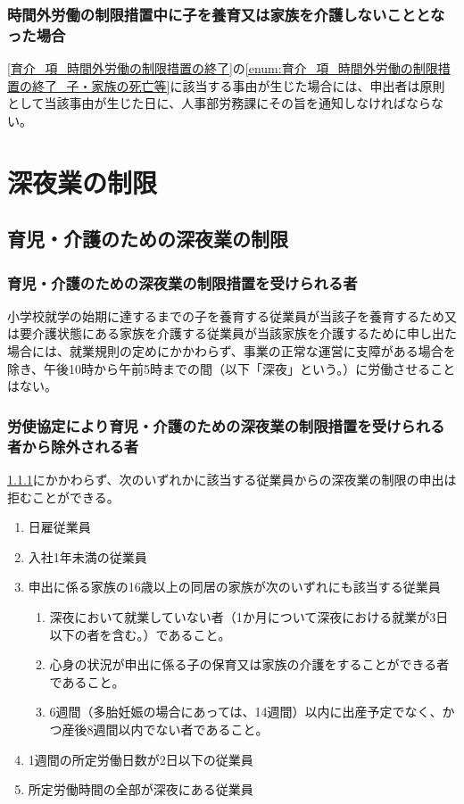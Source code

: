 \documentclass{jsarticle}
\begin{document}
\subsubsection{時間外労働の制限措置中に子を養育又は家族を介護しないこととなった場合}
\label{育介_項_時間外労働の制限措置中に子を養育又は家族を介護しないこととなった場合}
\ref{育介_項_時間外労働の制限措置の終了}の\ref{enum:育介_項_時間外労働の制限措置の終了_子・家族の死亡等}に該当する事由が生じた場合には、申出者は原則として当該事由が生じた日に、人事部労務課にその旨を通知しなければならない。

\section{深夜業の制限}

\subsection{育児・介護のための深夜業の制限}
\label{育介_条_育児・介護のための深夜業の制限}

\subsubsection{育児・介護のための深夜業の制限措置を受けられる者}
\label{育介_項_育児・介護のための深夜業の制限措置を受けられる者}
小学校就学の始期に達するまでの子を養育する従業員が当該子を養育するため又は要介護状態にある家族を介護する従業員が当該家族を介護するために申し出た場合には、就業規則の定めにかかわらず、事業の正常な運営に支障がある場合を除き、午後10時から午前5時までの間（以下「深夜」という。）に労働させることはない。 

\subsubsection{労使協定により育児・介護のための深夜業の制限措置を受けられる者から除外される者}
\label{育介_項_労使協定により育児・介護のための深夜業の制限措置を受けられる者から除外される者}
\ref{育介_項_育児・介護のための深夜業の制限措置を受けられる者}にかかわらず、次のいずれかに該当する従業員からの深夜業の制限の申出は拒むことができる。
\begin{enumerate}
  \item 日雇従業員 
  \item 入社1年未満の従業員 
  \item 申出に係る家族の16歳以上の同居の家族が次のいずれにも該当する従業員
  \begin{enumerate}
    \item 深夜において就業していない者（1か月について深夜における就業が3日以下の者を含む。）であること。
    \item 心身の状況が申出に係る子の保育又は家族の介護をすることができる者であること。 
    \item 6週間（多胎妊娠の場合にあっては、14週間）以内に出産予定でなく、かつ産後8週間以内でない者であること。 
  \end{enumerate}
  \item 1週間の所定労働日数が2日以下の従業員
  \item 所定労働時間の全部が深夜にある従業員 
\end{enumerate}
\end{document}
